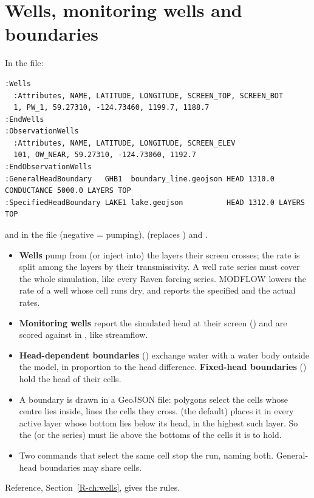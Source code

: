 \section{Wells, monitoring wells and boundaries}\label{sec:uwells}
\begin{whattowrite}
\small In the  file:
\begin{lstlisting}
:Wells
  :Attributes, NAME, LATITUDE, LONGITUDE, SCREEN_TOP, SCREEN_BOT
  1, PW_1, 59.27310, -124.73460, 1199.7, 1188.7
:EndWells
:ObservationWells
  :Attributes, NAME, LATITUDE, LONGITUDE, SCREEN_ELEV
  101, OW_NEAR, 59.27310, -124.73060, 1192.7
:EndObservationWells
:GeneralHeadBoundary   GHB1  boundary_line.geojson HEAD 1310.0 CONDUCTANCE 5000.0 LAYERS TOP
:SpecifiedHeadBoundary LAKE1 lake.geojson          HEAD 1312.0 LAYERS TOP
\end{lstlisting}
and in the  file  (negative = pumping),  (replaces
) and .
\end{whattowrite}
\begin{itemize}
\item \textbf{Wells} pump from (or inject into) the layers their screen crosses; the rate is split among the layers by
their transmissivity. A well rate series must cover the whole simulation, like every Raven forcing series. MODFLOW lowers
the rate of a well whose cell runs dry, and  reports the specified and the actual rates.
\item \textbf{Monitoring wells} report the simulated head at their screen () and are scored against
 in , like streamflow.
\item \textbf{Head-dependent boundaries} () exchange water with a water body outside the model,
in proportion to the head difference. \textbf{Fixed-head boundaries} () hold the head of their
cells.
\item A boundary is drawn in a GeoJSON file: polygons select the cells whose centre lies inside, lines the cells they
cross.  (the default) places it in every active layer whose bottom lies below its head, 
in the highest such layer. So the  (or the  series) must lie above the bottoms of the cells
it is to hold.
\item Two  commands that select the same cell stop the run, naming both. General-head
boundaries may share cells.
\end{itemize}
Reference, Section~\ref{R-ch:wells}, gives the rules.

